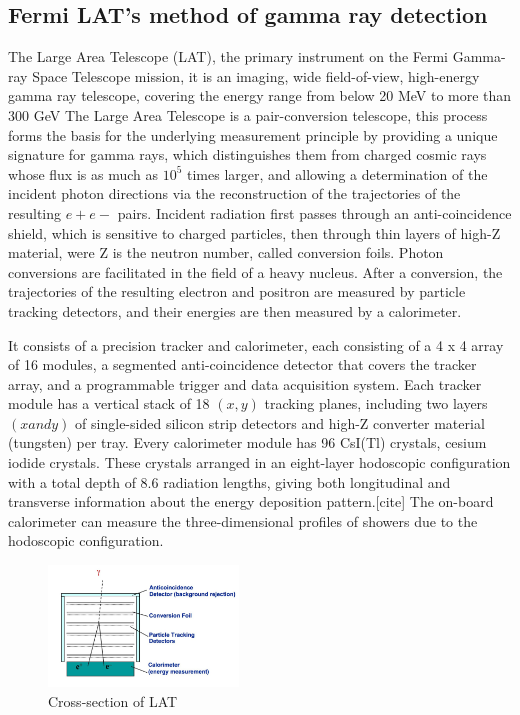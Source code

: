 \subsection {Fermi LAT's method of gamma ray detection}
The Large Area Telescope (LAT), the primary instrument on the Fermi Gamma-ray Space Telescope mission, it is an imaging, wide field-of-view, high-energy gamma ray telescope, covering the energy range from below 20 MeV to more than 300 GeV \cite{16}
The Large Area Telescope is a pair-conversion telescope, this process forms the basis for the underlying measurement principle by providing a unique signature for gamma rays, which distinguishes them from charged cosmic rays whose flux is as much as $10^{5}$ times larger, and allowing a determination of the incident photon directions via the reconstruction of the trajectories of the resulting $e+ e-$ pairs.
Incident radiation first passes through an anti-coincidence shield, which is sensitive to charged particles, then through thin layers of high-Z material, were Z is the neutron number, called conversion foils. Photon conversions are facilitated in the field of a heavy nucleus. After a conversion, the trajectories of the resulting electron and positron are measured by particle tracking detectors, and their energies are then measured by a calorimeter.\cite{17} \cite{16}
\par It consists of a precision tracker and calorimeter, each consisting of a 4 x 4 array of 16 modules, a segmented anti-coincidence detector that covers the tracker array, and a programmable trigger and data acquisition system. Each tracker module has a vertical stack of 18 $(x,y)$ tracking planes, including two layers $(x and y)$ of single-sided silicon strip detectors and high-Z converter material (tungsten) per tray. Every calorimeter module has 96 CsI(Tl) crystals, cesium iodide crystals. These crystals arranged in an eight-layer hodoscopic configuration with a total depth of 8.6 radiation lengths, giving both longitudinal and transverse information about the energy deposition pattern.[cite] The on-board calorimeter can measure the three-dimensional profiles of showers due to the hodoscopic configuration.\cite{17}
\begin{figure}[hbt!] \label{lat}
\begin{center}
\includegraphics[width=0.451\textwidth]{figs/lat.png}
\caption{Cross-section of LAT}
\end{center}
\end{figure}


